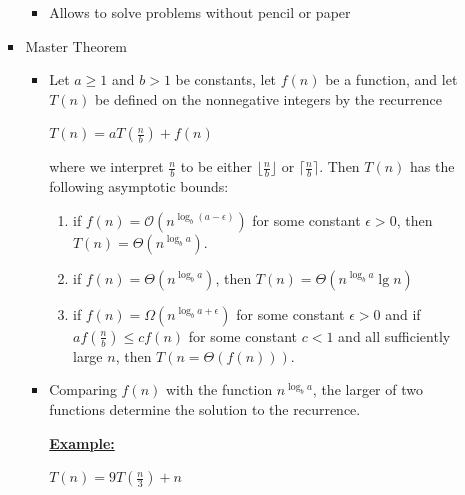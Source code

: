 \documentclass[12pt]{article}
\begin{document}
\begin{enumerate}[1.]
\begin{enumerate}[a)]
\begin{itemize}
\begin{itemize}
                \item Allows to solve problems without pencil or paper

            \end{itemize}

            \item Master Theorem

            \begin{itemize}
                \item Let $a \geq 1$ and $b > 1$ be constants, let $f(n)$ be a function, and
                let $T(n)$ be defined on the nonnegative integers by the recurrence

                \bigskip

                $T(n) = aT(\frac{n}{b}) + f(n)$

                \bigskip

                where we interpret $\frac{n}{b}$ to be either $\lfloor \frac{n}{b} \rfloor$ or
                $\lceil \frac{n}{b} \rceil$. Then $T(n)$ has the following asymptotic bounds:

                \begin{enumerate}[1.]
                    \item if $f(n) = \mathcal{O}(n^{\log_b (a - \epsilon)})$ for some constant $\epsilon > 0$, then $T(n) = \Theta(n^{\log_b a})$.
                    \item if $f(n) = \Theta(n^{\log_b a})$, then $T(n) = \Theta(n^{\log_b a}\lg n)$
                    \item if $f(n) = \Omega(n^{\log_b a + \epsilon})$ for some constant $\epsilon > 0$ and if
                    $af(\frac{n}{b}) \leq cf(n)$ for some constant $c < 1$ and all sufficiently large $n$,
                    then $T(n = \Theta(f(n)))$.
                \end{enumerate}

                \bigskip

                \item Comparing $f(n)$ with the function $n^{\log_b a}$, the larger of two functions determine the solution to the recurrence.

                \bigskip

                \underline{\textbf{Example:}}

                \bigskip

                $T(n) = 9T(\frac{n}{3}) + n$

                \bigskip


\end{itemize}
\end{itemize}
\end{enumerate}
\end{enumerate}
\end{document}
